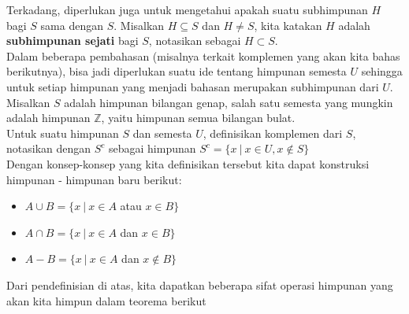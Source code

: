 	Terkadang, diperlukan juga untuk mengetahui apakah suatu subhimpunan $H$ bagi $S$ sama dengan $S$. Misalkan $H \subseteq S$ dan $H \ne S$, kita katakan $H$ adalah \textbf{subhimpunan sejati} bagi $S$, notasikan sebagai $H \subset S$.
	\\
	
	Dalam beberapa pembahasan (misalnya terkait komplemen yang akan kita bahas berikutnya), bisa jadi diperlukan suatu ide tentang himpunan semesta $U$ sehingga untuk setiap himpunan yang menjadi bahasan merupakan subhimpunan dari $U$. Misalkan $S$ adalah himpunan bilangan genap, salah satu semesta yang mungkin adalah himpunan $\mathbb{Z}$, yaitu himpunan semua bilangan bulat.
	\\
	
	Untuk suatu himpunan $S$ dan semesta $U$, definisikan komplemen dari $S$, notasikan dengan $S^c$ sebagai himpunan $S^c = \{x \ | \ x \in U, x \notin S \}$
	\\
	
	Dengan konsep-konsep yang kita definisikan tersebut kita dapat konstruksi himpunan - himpunan baru berikut: \begin{itemize}
		\item $A \cup B = \{ x \ | \ x \in A$ atau $x \in B \}$
		\item $A \cap B = \{ x \ | \ x \in A$ dan $x \in B \}$
		\item $A - B = \{ x \ | \ x \in A$ dan $x \notin B \}$
	\end{itemize}
	Dari pendefinisian di atas, kita dapatkan beberapa sifat operasi himpunan yang akan kita himpun dalam teorema berikut
	
